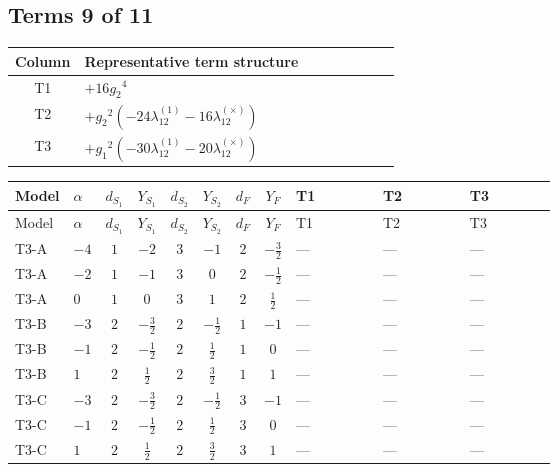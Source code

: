 \documentclass[8pt]{article}
\begin{document}
\begin{landscape}
\subsection*{Terms 9 of 11}
\begin{center}
\begin{tabular}{@{}c >{\raggedright\arraybackslash}p{0.82\linewidth}@{}}
\toprule
Column & Representative term structure \\
\midrule
T1 & \(\displaystyle +16 {g_2}^4\) \\
\midrule
T2 & \(\displaystyle +{g_2}^2 (-24 {\lambda_{12}^{(1)}}-16 {\lambda_{12}^{(\times)}})\) \\
\midrule
T3 & \(\displaystyle +{g_1}^2 (-30 {\lambda_{12}^{(1)}}-20 {\lambda_{12}^{(\times)}})\) \\
\midrule
\bottomrule
\end{tabular}
\end{center}
\smallskip
\tiny
\begin{longtable}{@{}llcccccc >{\raggedright\arraybackslash}p{0.21\linewidth} >{\raggedright\arraybackslash}p{0.21\linewidth} >{\raggedright\arraybackslash}p{0.21\linewidth}@{}}
\toprule
Model & $\alpha$ & $d_{S_1}$ & $Y_{S_1}$ & $d_{S_2}$ & $Y_{S_2}$ & $d_F$ & $Y_F$ & T1 & T2 & T3 \\
\midrule
\endfirsthead
\toprule
Model & $\alpha$ & $d_{S_1}$ & $Y_{S_1}$ & $d_{S_2}$ & $Y_{S_2}$ & $d_F$ & $Y_F$ & T1 & T2 & T3 \\
\midrule
\endhead
T3-A & $-4$ & $1$ & $-2$ & $3$ & $-1$ & $2$ & $-\frac{3}{2}$ & --- & --- & --- \\
\midrule
T3-A & $-2$ & $1$ & $-1$ & $3$ & $0$ & $2$ & $-\frac{1}{2}$ & --- & --- & --- \\
\midrule
T3-A & $0$ & $1$ & $0$ & $3$ & $1$ & $2$ & $\frac{1}{2}$ & --- & --- & --- \\
\midrule
T3-B & $-3$ & $2$ & $-\frac{3}{2}$ & $2$ & $-\frac{1}{2}$ & $1$ & $-1$ & --- & --- & --- \\
\midrule
T3-B & $-1$ & $2$ & $-\frac{1}{2}$ & $2$ & $\frac{1}{2}$ & $1$ & $0$ & --- & --- & --- \\
\midrule
T3-B & $1$ & $2$ & $\frac{1}{2}$ & $2$ & $\frac{3}{2}$ & $1$ & $1$ & --- & --- & --- \\
\midrule
T3-C & $-3$ & $2$ & $-\frac{3}{2}$ & $2$ & $-\frac{1}{2}$ & $3$ & $-1$ & --- & --- & --- \\
\midrule
T3-C & $-1$ & $2$ & $-\frac{1}{2}$ & $2$ & $\frac{1}{2}$ & $3$ & $0$ & --- & --- & --- \\
\midrule
T3-C & $1$ & $2$ & $\frac{1}{2}$ & $2$ & $\frac{3}{2}$ & $3$ & $1$ & --- & --- & --- \\

\end{longtable}
\end{landscape}
\end{document}
